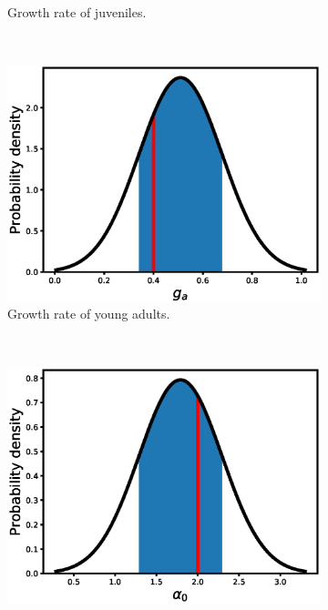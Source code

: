 \documentclass[12pt, table]{article}
\begin{document}
\begin{figure}[H]
\begin{subfigure}[b]{0.45\textwidth}
       \caption{Growth rate of  juveniles.}
       \label{fig2a}
   \end{subfigure}
   ~ %
   \begin{subfigure}[b]{0.45\textwidth}
       \includegraphics[width=1\textwidth, height=0.24\textheight]{figexple3/fgj}
        \caption{Growth rate of young adults.}
       \label{fig2b}
   \end{subfigure}\\
   \begin{subfigure}[b]{0.45\textwidth}
       \includegraphics[width=1\textwidth, height=0.24\textheight]{figexple3/falpha0}
      

\end{subfigure}
\end{figure}
\end{document}

